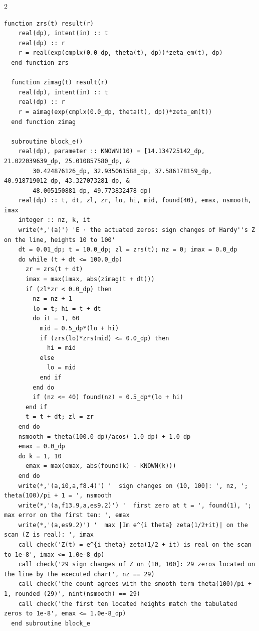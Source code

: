 \documentclass[10pt]{article}
\begin{document}
\begin{multicols}{2}
\begin{Verbatim}[fontsize=\fontsize{6.2}{7.2}\selectfont,breaklines,breakanywhere,breaksymbolleft={}]
  function zrs(t) result(r)
    real(dp), intent(in) :: t
    real(dp) :: r
    r = real(exp(cmplx(0.0_dp, theta(t), dp))*zeta_em(t), dp)
  end function zrs

  function zimag(t) result(r)
    real(dp), intent(in) :: t
    real(dp) :: r
    r = aimag(exp(cmplx(0.0_dp, theta(t), dp))*zeta_em(t))
  end function zimag

  subroutine block_e()
    real(dp), parameter :: KNOWN(10) = [14.134725142_dp, 21.022039639_dp, 25.010857580_dp, &
        30.424876126_dp, 32.935061588_dp, 37.586178159_dp, 40.918719012_dp, 43.327073281_dp, &
        48.005150881_dp, 49.773832478_dp]
    real(dp) :: t, dt, zl, zr, lo, hi, mid, found(40), emax, nsmooth, imax
    integer :: nz, k, it
    write(*,'(a)') 'E · the actuated zeros: sign changes of Hardy''s Z on the line, heights 10 to 100'
    dt = 0.01_dp; t = 10.0_dp; zl = zrs(t); nz = 0; imax = 0.0_dp
    do while (t + dt <= 100.0_dp)
      zr = zrs(t + dt)
      imax = max(imax, abs(zimag(t + dt)))
      if (zl*zr < 0.0_dp) then
        nz = nz + 1
        lo = t; hi = t + dt
        do it = 1, 60
          mid = 0.5_dp*(lo + hi)
          if (zrs(lo)*zrs(mid) <= 0.0_dp) then
            hi = mid
          else
            lo = mid
          end if
        end do
        if (nz <= 40) found(nz) = 0.5_dp*(lo + hi)
      end if
      t = t + dt; zl = zr
    end do
    nsmooth = theta(100.0_dp)/acos(-1.0_dp) + 1.0_dp
    emax = 0.0_dp
    do k = 1, 10
      emax = max(emax, abs(found(k) - KNOWN(k)))
    end do
    write(*,'(a,i0,a,f8.4)') '  sign changes on (10, 100]: ', nz, ';  theta(100)/pi + 1 = ', nsmooth
    write(*,'(a,f13.9,a,es9.2)') '  first zero at t = ', found(1), ';  max error on the first ten: ', emax
    write(*,'(a,es9.2)') '  max |Im e^{i theta} zeta(1/2+it)| on the scan (Z is real): ', imax
    call check('Z(t) = e^{i theta} zeta(1/2 + it) is real on the scan to 1e-8', imax <= 1.0e-8_dp)
    call check('29 sign changes of Z on (10, 100]: 29 zeros located on the line by the executed chart', nz == 29)
    call check('the count agrees with the smooth term theta(100)/pi + 1, rounded (29)', nint(nsmooth) == 29)
    call check('the first ten located heights match the tabulated zeros to 1e-8', emax <= 1.0e-8_dp)
  end subroutine block_e


\end{Verbatim}
\end{multicols}
\end{document}
